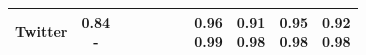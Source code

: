 \begin{table}[t]
{\begin{tabular}{p{3cm}|c|c|c|c|c|c|c|c|c|c}
\hline
Twitter & \shortstack{\scriptsize 0.84\\\scriptsize -} &  &  &  &  &  & \shortstack{\scriptsize 0.96\\\scriptsize 0.99} & \shortstack{\scriptsize 0.91\\\scriptsize 0.98} & \shortstack{\scriptsize 0.95\\\scriptsize 0.98} & \shortstack{\scriptsize 0.92\\\scriptsize 0.98} \\
\hline
\end{tabular}%
}
\end{table}
